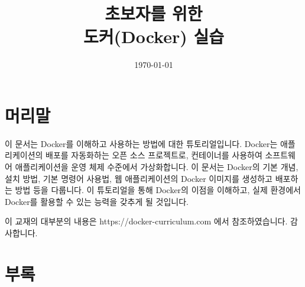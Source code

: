 \documentclass[book,chapter]{oblivoir}
\affiliation{국립목포대학교 컴퓨터공학과}{이영호}{youngho.lee@gmail.com}
\title{초보자를 위한 \\도커(Docker) 실습}
\date{\today}
\begin{document}
\maketitle
\printaffiliation
\chapter*{머리말}

이 문서는 Docker를 이해하고 사용하는 방법에 대한 튜토리얼입니다. Docker는 애플리케이션의 배포를 자동화하는 오픈 소스 프로젝트로, 컨테이너를 사용하여 소프트웨어 애플리케이션을 운영 체제 수준에서 가상화합니다. 이 문서는 Docker의 기본 개념, 설치 방법, 기본 명령어 사용법, 웹 애플리케이션의 Docker 이미지를 생성하고 배포하는 방법 등을 다룹니다. 이 튜토리얼을 통해 Docker의 이점을 이해하고, 실제 환경에서 Docker를 활용할 수 있는 능력을 갖추게 될 것입니다.

이 교재의 대부분의 내용은 https://docker-curriculum.com 에서 참조하였습니다. 감사합니다.

\newpage
\tableofcontents













\chapter*{부록}

\end{document}
